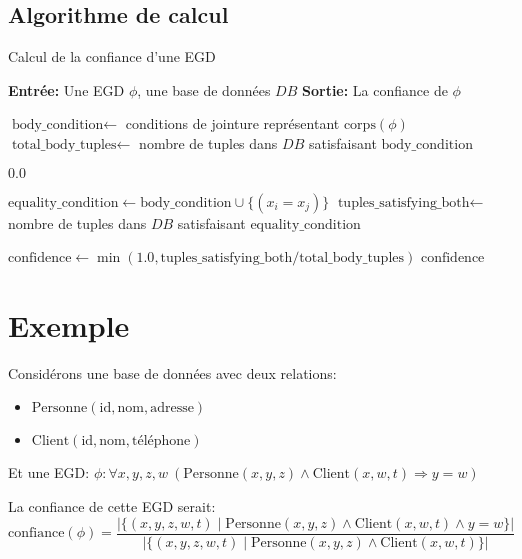 \documentclass{article}
\begin{document}
\subsection{Algorithme de calcul}

\begin{algorithm}
\caption{Calcul de la confiance d'une EGD}
\begin{algorithmic}
\STATE \textbf{Entrée:} Une EGD $\phi$, une base de données $DB$
\STATE \textbf{Sortie:} La confiance de $\phi$

\STATE $\text{body\_condition} \gets$ conditions de jointure représentant $\text{corps}(\phi)$
\STATE $\text{total\_body\_tuples} \gets$ nombre de tuples dans $DB$ satisfaisant $\text{body\_condition}$

    \RETURN $0.0$
\ENDIF

\STATE $\text{equality\_condition} \gets \text{body\_condition} \cup \{(x_i = x_j)\}$
\STATE $\text{tuples\_satisfying\_both} \gets$ nombre de tuples dans $DB$ satisfaisant $\text{equality\_condition}$

\STATE $\text{confidence} \gets \min(1.0, \text{tuples\_satisfying\_both} / \text{total\_body\_tuples})$
\RETURN $\text{confidence}$
\end{algorithmic}
\end{algorithm}

\section{Exemple}

Considérons une base de données avec deux relations:
\begin{itemize}
    \item $\text{Personne}(\text{id}, \text{nom}, \text{adresse})$
    \item $\text{Client}(\text{id}, \text{nom}, \text{téléphone})$
\end{itemize}

Et une EGD:
$\phi: \forall x, y, z, w \ (\text{Personne}(x, y, z) \wedge \text{Client}(x, w, t) \Rightarrow y = w)$

La confiance de cette EGD serait:
\begin{equation}
\text{confiance}(\phi) = \frac{|\{(x,y,z,w,t) \mid \text{Personne}(x,y,z) \wedge \text{Client}(x,w,t) \wedge y = w\}|}{|\{(x,y,z,w,t) \mid \text{Personne}(x,y,z) \wedge \text{Client}(x,w,t)\}|}
\end{equation}
\end{document}
